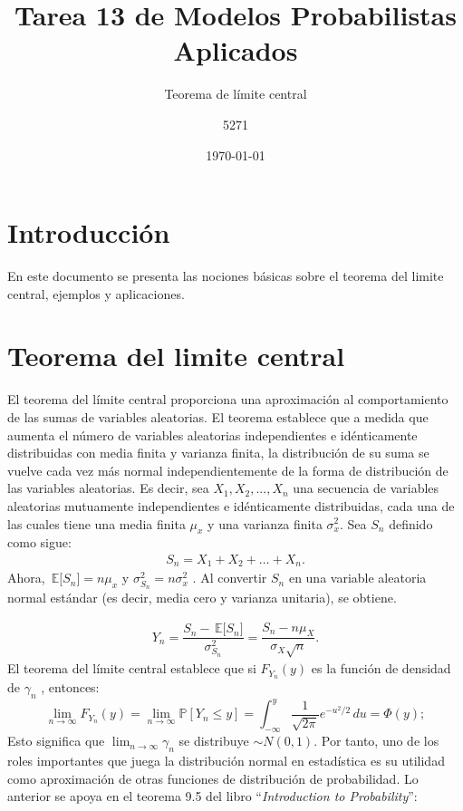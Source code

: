 \documentclass{article}
\title{Tarea 13 de Modelos Probabilistas Aplicados}
\subtitle{Teorema de límite central}
\author{5271}
\date{\today}
\renewcommand{\P}{\ensuremath{\mathbb{P}}}
\newcommand\espe[1]{\, \mathbb{E} \lbrack #1 \rbrack}
\begin{document}
\maketitle
\section{Introducción}
En este documento se presenta las nociones básicas sobre el teorema del limite central, ejemplos y aplicaciones.
\section{Teorema del limite central}
El teorema del límite central proporciona una aproximación al comportamiento de las sumas de variables aleatorias. El teorema establece que a medida que aumenta el número de variables aleatorias independientes e idénticamente distribuidas con media finita y varianza finita, la distribución de su suma se vuelve cada vez más normal independientemente de la forma de distribución de las variables aleatorias. Es decir, sea $X_1,X_2,...,X_n$ una secuencia de variables aleatorias mutuamente independientes e idénticamente distribuidas, cada una de las cuales tiene una media finita $\mu_{x}$ y una varianza finita $\sigma^{2}_{x}$. Sea $S_{n}$ definido como sigue:
\begin{align}
   S_n = X_1 + X_2 + \ldots + X_n. 
\end{align}
Ahora, $\espe{S_n}= n\mu_{x}$ y $\sigma^{2}_{S_{n}}= n\sigma^{2}_{x}$ . Al convertir $S_n$ en una variable aleatoria normal estándar (es decir, media cero y varianza unitaria), se obtiene.

\begin{align}
    Y_n = \dfrac{S_n-\espe{S_n}}{\sigma^{2}_{S_{n}}}= \dfrac{S_n-n\mu_{X}}{\sigma_X\sqrt{n}}.
\end{align}
El teorema del límite central establece que si $F_{Y_{n}}(y)$ es la función de densidad  de $\gamma_n$ , entonces:
\begin{equation}
	\lim_{n \rightarrow \infty} F_{Y_{n}}(y) =\lim_{n \rightarrow \infty} \P{\left[Y_{n}\leq y \right]} = \int_{-\infty}^{y} \frac{1}{\sqrt{2 \pi}} e^{-u^2 / 2} \, du = \Phi(y) ;
\end{equation}
Esto significa que $\lim_{n \rightarrow \infty}\gamma_{n}$ se distribuye $\sim N(0,1)$. Por tanto, uno de los roles importantes que juega la distribución normal en estadística es su utilidad como aproximación de otras funciones de distribución de probabilidad.
Lo anterior se apoya en el teorema 9.5 del libro ``\textit{Introduction to Probability}''\cite{libProba}:
\end{document}
